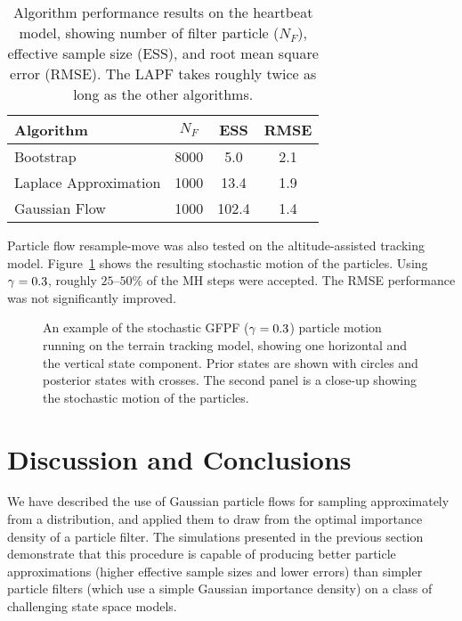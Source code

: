 \documentclass{article}
\begin{document}
\begin{table}
\centering
\begin{tabular}{l||c|c|c}
Algorithm                                & $N_F$ & ESS  & RMSE \\
\hline
Bootstrap                                & 8000 & 5.0   &  2.1 \\
Laplace Approximation                    & 1000 & 13.4  &  1.9 \\
Gaussian Flow                            & 1000 & 102.4 &  1.4 \\
\end{tabular}
\caption{Algorithm performance results on the heartbeat model, showing number of filter particle ($N_F$), effective sample size (ESS), and root mean square error (RMSE). The LAPF takes roughly twice as long as the other algorithms.}
\label{tab:sineha_results}
\end{table}

Particle flow resample-move was also tested on the altitude-assisted tracking model. Figure~\ref{fig:drone_example_frame_stochastic} shows the resulting stochastic motion of the particles. Using $\gamma=0.3$, roughly $25$--$50\%$ of the MH steps were accepted. The RMSE performance was not significantly improved.
%
\begin{figure}
\centering
\subfloat[]{}
\subfloat[]{}
\caption{An example of the stochastic GFPF ($\gamma=0.3$) particle motion running on the terrain tracking model, showing one horizontal and the vertical state component. Prior states are shown with circles and posterior states with crosses. The second panel is a close-up showing the stochastic motion of the particles.}
\label{fig:drone_example_frame_stochastic}
\end{figure}


\section{Discussion and Conclusions}

We have described the use of Gaussian particle flows for sampling approximately from a distribution, and applied them to draw from the optimal importance density of a particle filter. The simulations presented in the previous section demonstrate that this procedure is capable of producing better particle approximations (higher effective sample sizes and lower errors) than simpler particle filters (which use a simple Gaussian importance density) on a class of challenging state space models.
\end{document}
